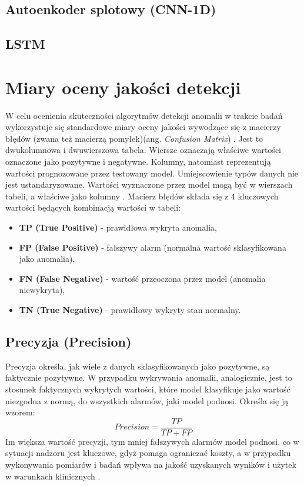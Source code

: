 \documentclass[a4paper,twoside,12pt]{book}
\newcommand{\obcy}[1]{\emph{#1}}
\newcommand{\english}[1]{{\selectlanguage{british}\obcy{#1}}}
\begin{document}
	\subsection{Autoenkoder splotowy (CNN-1D)}
	\subsection{LSTM}
	
	
	
	\section{Miary oceny jakości detekcji}
	
	W celu ocenienia skuteczności algorytmów detekcji anomalii w trakcie badań wykorzystuje się standardowe miary oceny jakości wywodzące się z macierzy błędów (zwana też macierzą pomyłek)(ang. \english{Confusion Matrix}) \cite{yang2024confusion}. Jest to dwukolumnowa i dwuwierszowa tabela. Wiersze oznaczają właściwe wartości oznaczone jako pozytywne i negatywne. Kolumny, natomiast reprezentują wartości prognozowane przez testowany model. Umiejscowienie typów danych nie jest ustandaryzowane. Wartości wyznaczone przez model mogą być w wierszach tabeli, a właściwe jako kolumny \cite{yang2024confusion}. Macierz błędów składa się z 4 kluczowych wartości będących kombinacją wartości w tabeli:
	\begin{itemize}
		\item \textbf{TP (True Positive)} - prawidłowa wykryta anomalia,
		\item \textbf{FP (False  Positive)} - fałszywy alarm (normalna wartość sklasyfikowana jako anomalia),
		\item \textbf{FN (False Negative)} - wartość przeoczona przez model (anomalia niewykryta),
		\item \textbf{TN (True Negative)} - prawidłowy wykryty stan normalny.
	\end{itemize}
	
	\subsection{Precyzja (Precision)}
	Precyzja określa, jak wiele z danych sklasyfikowanych jako pozytywne, są faktycznie pozytywne. W przypadku wykrywania anomalii, analogicznie, jest to stosunek faktycznych wykrytych wartości, które model klasyfikuje jako wartość niezgodna z normą, do wszystkich alarmów, jaki model podnosi. Określa się ją wzorem:
	\begin{equation}
		Precision = \frac{TP}{TP + FP}
		\label{eq:precision}
	\end{equation} 
	Im większa wartość precyzji, tym mniej fałszywych alarmów model podnosi, co w sytuacji nadzoru jest kluczowe, gdyż pomaga ograniczać koszty, a w przypadku wykonywania pomiarów i badań wpływa na jakość uzyskanych wyników i użytek w warunkach klinicznych \cite{yang2024confusion}.
	
\end{document}
